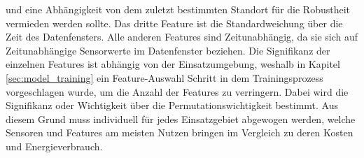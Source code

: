 und eine Abhängigkeit von dem zuletzt bestimmten Standort für die Robustheit vermieden werden sollte.
Das dritte Feature ist die Standardweichung über die Zeit des Datenfensters.
Alle anderen Features sind Zeitunabhängig, da sie sich auf Zeitunabhängige Sensorwerte im Datenfenster beziehen.
\newline
\newline
Die Signifikanz der einzelnen Features ist abhängig von der Einsatzumgebung, weshalb in Kapitel \ref{sec:model_training}
ein Feature-Auswahl Schritt in dem Trainingsprozess vorgeschlagen wurde, um die Anzahl der Features zu verringern.
Dabei wird die Signifikanz oder Wichtigkeit über die Permutationswichtigkeit bestimmt.
Aus diesem Grund muss individuell für jedes Einsatzgebiet abgewogen werden, welche Sensoren und Features am meisten Nutzen bringen
im Vergleich zu deren Kosten und Energieverbrauch.
